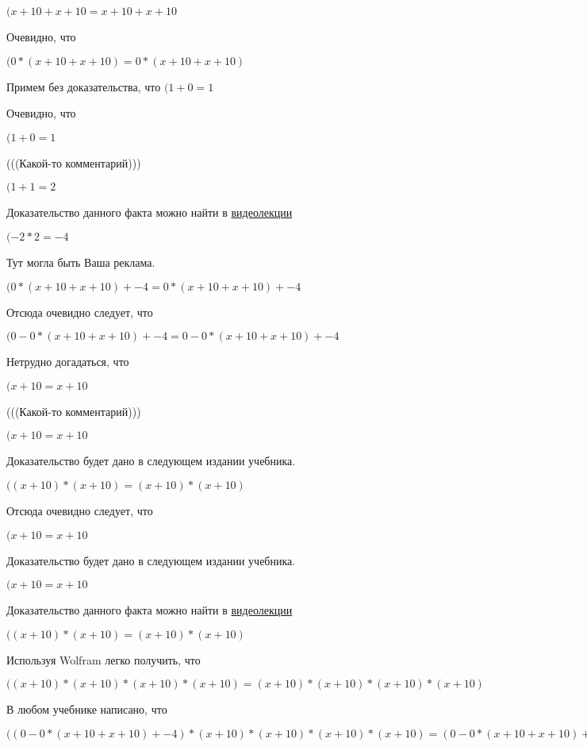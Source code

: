 \documentclass[12pt,a4paper,fleqn]{article}
\theoremstyle{definition}
\begin{document}
$( x  +  10  +  x  +  10  =  x  +  10  +  x  +  10 $

Очевидно, что

$( 0  * ( x  +  10  +  x  +  10 ) =  0  * ( x  +  10  +  x  +  10 )$

Примем без доказательства, что
$( 1  +  0  =  1 $

Очевидно, что

$( 1  +  0  =  1 $

(((Какой-то комментарий)))

$( 1  +  1  =  2 $

Доказательство данного факта можно найти в \href{https://www.youtube.com/watch?v=dQw4w9WgXcQ}{видеолекции}

$( -2  *  2  =  -4 $

Тут могла быть Ваша реклама.

$( 0  * ( x  +  10  +  x  +  10 ) +  -4  =  0  * ( x  +  10  +  x  +  10 ) +  -4 $

Отсюда очевидно следует, что

$( 0  -  0  * ( x  +  10  +  x  +  10 ) +  -4  =  0  -  0  * ( x  +  10  +  x  +  10 ) +  -4 $

Нетрудно догадаться, что

$( x  +  10  =  x  +  10 $

(((Какой-то комментарий)))

$( x  +  10  =  x  +  10 $

Доказательство будет дано в следующем издании учебника.

$(( x  +  10 ) * ( x  +  10 ) = ( x  +  10 ) * ( x  +  10 )$

Отсюда очевидно следует, что

$( x  +  10  =  x  +  10 $

Доказательство будет дано в следующем издании учебника.

$( x  +  10  =  x  +  10 $

Доказательство данного факта можно найти в \href{https://www.youtube.com/watch?v=dQw4w9WgXcQ}{видеолекции}

$(( x  +  10 ) * ( x  +  10 ) = ( x  +  10 ) * ( x  +  10 )$

Используя Wolfram легко получить, что

$(( x  +  10 ) * ( x  +  10 ) * ( x  +  10 ) * ( x  +  10 ) = ( x  +  10 ) * ( x  +  10 ) * ( x  +  10 ) * ( x  +  10 )$

В любом учебнике написано, что

$(( 0  -  0  * ( x  +  10  +  x  +  10 ) +  -4 ) * ( x  +  10 ) * ( x  +  10 ) * ( x  +  10 ) * ( x  +  10 ) = ( 0  -  0  * ( x  +  10  +  x  +  10 ) +  -4 ) * ( x  +  10 ) * ( x  +  10 ) * ( x  +  10 ) * ( x  +  10 )$
\end{document}
